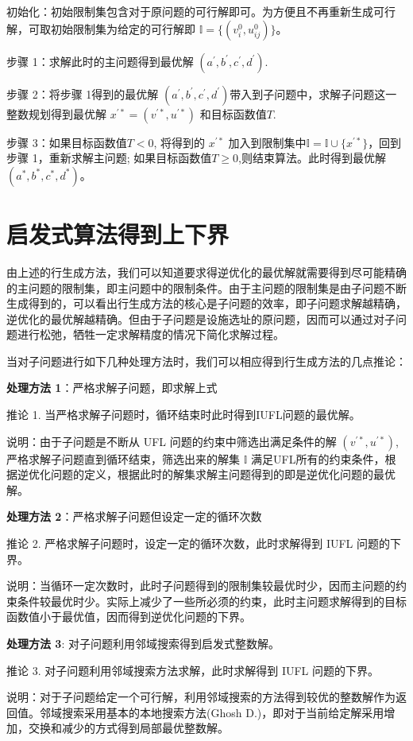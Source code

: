 \documentclass[UTF8]{article}
\begin{document}
初始化：初始限制集包含对于原问题的可行解即可。为方便且不再重新生成可行解，可取初始限制集为给定的可行解即 $\mathbb{I} = \{(v_i^0,u_{ij}^0)\} $。

步骤 1：求解此时的主问题得到最优解 $(a^{'},b^{'},c^{'},d^{'})$.

步骤 2：将步骤 1得到的最优解 $(a^{'},b^{'},c^{'},d^{'})$带入到子问题中，求解子问题这一整数规划得到最优解 $x^{'*}=(v^{'*},u^{'*})$ 和目标函数值$T$.

步骤 3：如果目标函数值$T< 0$, 将得到的 $x^{'*}$ 加入到限制集中$\mathbb{I} = \mathbb{I} \cup \{x^{'*}\}$，回到步骤 1，重新求解主问题;  如果目标函数值$T\geq 0$,则结束算法。此时得到最优解$(a^{*},b^{*},c^{*},d^{*})$。


\section{启发式算法得到上下界}

由上述的行生成方法，我们可以知道要求得逆优化的最优解就需要得到尽可能精确的主问题的限制集，即主问题中的限制条件。由于主问题的限制集是由子问题不断生成得到的，可以看出行生成方法的核心是子问题的效率，即子问题求解越精确，逆优化的最优解越精确。但由于子问题是设施选址的原问题，因而可以通过对子问题进行松弛，牺牲一定求解精度的情况下简化求解过程。

当对子问题进行如下几种处理方法时，我们可以相应得到行生成方法的几点推论：

\textbf{处理方法 1}：严格求解子问题，即求解上式

推论 1. 当严格求解子问题时，循环结束时此时得到IUFL问题的最优解。

说明：由于子问题是不断从 UFL 问题的约束中筛选出满足条件的解 $(v^{'*},u^{'*})$, 严格求解子问题直到循环结束，筛选出来的解集 $\mathbb{I}$ 满足UFL所有的约束条件，根据逆优化问题的定义，根据此时的解集求解主问题得到的即是逆优化问题的最优解。

\textbf{处理方法 2}：严格求解子问题但设定一定的循环次数

推论 2. 严格求解子问题时，设定一定的循环次数，此时求解得到 IUFL 问题的下界。

说明：当循环一定次数时，此时子问题得到的限制集较最优时少，因而主问题的约束条件较最优时少。实际上减少了一些所必须的约束，此时主问题求解得到的目标函数值小于最优值，因而得到逆优化问题的下界。

\textbf{处理方法 3}: 对子问题利用邻域搜索得到启发式整数解。

推论 3. 对子问题利用邻域搜索方法求解，此时求解得到 IUFL 问题的下界。

说明：对于子问题给定一个可行解，利用邻域搜索的方法得到较优的整数解作为返回值。邻域搜索采用基本的本地搜索方法(Ghosh D.)，即对于当前给定解采用增加，交换和减少的方式得到局部最优整数解。
\end{document}
